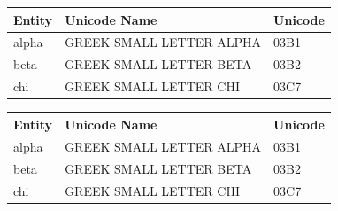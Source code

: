 \documentclass{article}
\begin{document}
\begin{center}
\begin{supertabular}{lll}
\bfseries Entity&\bfseries  Unicode Name&\bfseries  Unicode\\
\hline
alpha              & GREEK SMALL LETTER ALPHA            & 03B1\\
beta               & GREEK SMALL LETTER BETA             & 03B2\\
chi                & GREEK SMALL LETTER CHI              & 03C7\\
\end{supertabular}
\end{center}

\begin{center}
\tablecaption{}
\begin{supertabular}{lll}
\bfseries Entity&\bfseries  Unicode Name&\bfseries  Unicode\\
\hline
alpha              & GREEK SMALL LETTER ALPHA            & 03B1\\
beta               & GREEK SMALL LETTER BETA             & 03B2\\
chi                & GREEK SMALL LETTER CHI              & 03C7\\
\end{supertabular}
\end{center}
\end{document}
